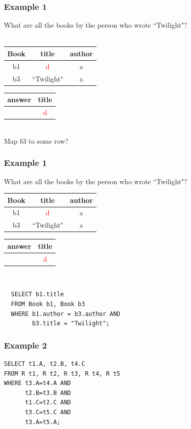 \documentclass{beamer}
\begin{document}
\begin{frame}
  \frametitle{Example 1}
  What are all the books by the person who wrote ``Twilight"?\\
  \hfill \\
  \begin{tabular}{ c | c c }
  Book & title & author \\
  \hline
   b1 & \textcolor{red}{d} & a \\
   b3 & ``Twilight" & a \\
  \end{tabular}
  \begin{tabular}{ c | c}
  answer & title \\
  \hline
   & \textcolor{red}{d}\\
  \end{tabular}
  \hfill \\
  Map $b3$ to some row?
\end{frame}

\begin{frame}[fragile]
  \frametitle{Example 1}
  What are all the books by the person who wrote ``Twilight"?\\
  \begin{tabular}{ c | c c }
  Book & title & author \\
  \hline
  b1 & \textcolor{red}{d} & a \\
  b3 & ``Twilight" & a \\
  \end{tabular}
  \begin{tabular}{ c | c}
  answer & title \\
  \hline
   & \textcolor{red}{d}\\
  \end{tabular}
  \hfill \\
\begin{verbatim}
  SELECT b1.title
  FROM Book b1, Book b3
  WHERE b1.author = b3.author AND
        b3.title = "Twilight";
\end{verbatim}        
\end{frame}

\begin{frame}[fragile]
  \frametitle{Example 2}
\begin{verbatim}  
SELECT t1.A, t2.B, t4.C
FROM R t1, R t2, R t3, R t4, R t5
WHERE t3.A=t4.A AND
      t2.B=t3.B AND
      t1.C=t2.C AND
      t3.C=t5.C AND
      t3.A=t5.A;
\end{verbatim}  
\end{frame}
\end{document}
